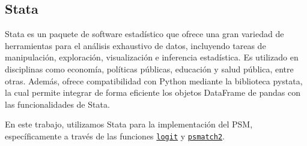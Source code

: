 \documentclass[../../main.tex]{subfiles}
\begin{document}
\subsection{Stata}
Stata \cite{stata-docs} es un paquete de software estadístico que ofrece una gran variedad
de herramientas para el análisis exhaustivo de datos, incluyendo tareas de manipulación,
exploración, visualización e inferencia estadística. Es utilizado en disciplinas como
economía, políticas públicas, educación y salud pública, entre otras. Además, ofrece
compatibilidad con Python mediante la biblioteca pystata, la cual permite integrar de
forma eficiente los objetos DataFrame de pandas con las funcionalidades de Stata.

En este trabajo, utilizamos Stata para la implementación del PSM, específicamente a través
de las funciones \href{https://www.stata.com/manuals/rlogit.pdf}{\texttt{logit}} y
\href{http://repec.org/bocode/p/psmatch2.html}{\texttt{psmatch2}}.
\end{document}

